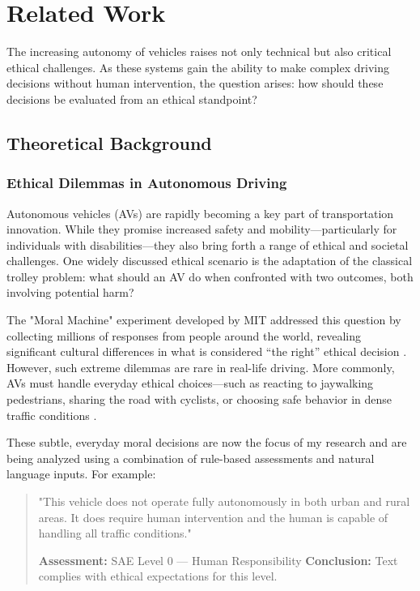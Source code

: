 \chapter{Related Work}

The increasing autonomy of vehicles raises not only technical but also critical ethical challenges. As these systems gain the ability to make complex driving decisions without human intervention, the question arises: how should these decisions be evaluated from an ethical standpoint?

\section{Theoretical Background}

\subsection{Ethical Dilemmas in Autonomous Driving}

Autonomous vehicles (AVs) are rapidly becoming a key part of transportation innovation. While they promise increased safety and mobility—particularly for individuals with disabilities—they also bring forth a range of ethical and societal challenges. One widely discussed ethical scenario is the adaptation of the classical trolley problem: what should an AV do when confronted with two outcomes, both involving potential harm?

The "Moral Machine" experiment developed by MIT addressed this question by collecting millions of responses from people around the world, revealing significant cultural differences in what is considered “the right” ethical decision \cite{shariff2018moral}. However, such extreme dilemmas are rare in real-life driving. More commonly, AVs must handle everyday ethical choices—such as reacting to jaywalking pedestrians, sharing the road with cyclists, or choosing safe behavior in dense traffic conditions \cite{greene2016driverless}.

These subtle, everyday moral decisions are now the focus of my research and are being analyzed using a combination of rule-based assessments and natural language inputs. For example:

\begin{quote}
"This vehicle does not operate fully autonomously in both urban and rural areas. It does require human intervention and the human is capable of handling all traffic conditions."

\textbf{Assessment:} SAE Level 0 — Human Responsibility  
\textbf{Conclusion:} Text complies with ethical expectations for this level.
\end{quote}

